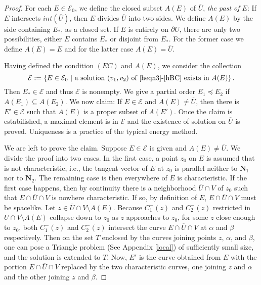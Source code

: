 \documentclass[11pt]{amsart}
\theoremstyle{plain}
\theoremstyle{remark}
\numberwithin{equation}{section}
\numberwithin{Thm}{section}
\def\U{\overline{U}}
\def\N{{\mathbf N}}
\begin{document}
\begin{proof}
For each $E\in\mathcal{E}_0$, we define the closed subset $A(E)$ of $\U$, {\it the past of $E$}: If $E$ intersects $int(\U)$, then $E$ divides $\U$ into two sides. We define $A(E)$ by the side containing $E_*$, as a closed set. If $E$ is entirely on $\partial U$, there are only two possibilities, either $E$ contains $E_*$ or disjoint from $E_*$. For the former case we define $A(E)=E$ and for the latter case $A(E)=\U$. 

Having defined the condition $(EC)$ and $A(E)$, we consider the collection
$$\mathcal{E}:=\left\{ E \in \mathcal{E}_0 ~|~ \text{a solution $(v_1,v_2)$ of \eqref{heqn3}-\eqref{hBC} exists in $A(E)$} \right\}.$$ 
Then $E_* \in \mathcal{E}$ and thus $\mathcal{E}$ is nonempty. We give a partial order $E_1 \preceq E_2$ if $A(E_1)\subseteq A(E_2)$. We now claim: If $E\in \mathcal{E}$ and $A(E)\ne \U$, then there is $E'\in \mathcal{E}$ such that $A(E)$ is a proper subset of $A(E')$. Once the claim is estabilished, a maximal element is in $\mathcal{E}$ and the existence of solution on $\U$ is proved. Uniqueness is a practice of the typical energy method. 

We are left to prove the claim. Suppose $E \in \mathcal{E}$ is given and $A(E)\ne \U$. We divide the proof into two cases. In the first case, a point $z_0$ on $E$ is assumed that is not characteristic, i.e., the tangent vector of $E$ at $z_0$ is parallel neither to $\N_1$ nor to $\N_2$. The remaining case is then everywhere of $E$ is characteristic. If the first case happens, then by continuity there is a neighborhood $\U\cap V$ of $z_0$ such that $E\cap \U \cap V$ is nowhere characteristic. If so, by definition of $E$, $E\cap \U \cap V$ must be spacelike. Let $z \in \U \cap V \setminus A(E)$. Because $C^-_1(z)$ and $C^-_2(z)$ restricted in $\U \cap V \setminus A(E)$ collapse down to $z_0$  as $z$ approaches to $z_0$, for some $z$ close enough to $z_0$, both $C^-_1(z)$ and $C^-_2(z)$ intersect the curve $E\cap \U \cap V$ at $\alpha$ and $\beta$ respectively. Then on the set $T$ enclosed by the curves joining points $z$, $\alpha$, and $\beta$, one can pose a Triangle problem (See Appendix \ref{local}) of sufficiently small size, and the solution is extended to $T$. Now, $E'$ is the curve obtained from $E$ with the portion $E\cap \U \cap V$ replaced by the two characteristic curves, one joining $z$ and $\alpha$ and the other joining $z$ and $\beta$.


\end{proof}
\end{document}
